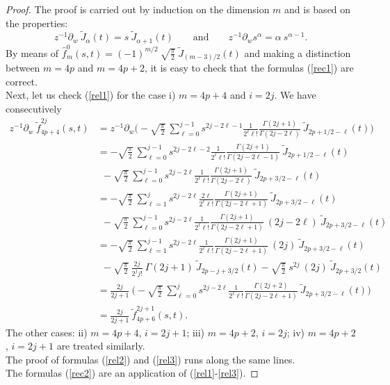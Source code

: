 \documentclass{amsart}
\theoremstyle{remark}
\begin{document}
\begin{proof}
The proof is carried out by induction on the dimension $m$ and is based on the properties:
\begin{displaymath}
z^{-1}  \partial_w \ \widetilde{J}_{\alpha}(t) = s \ \widetilde{J}_{\alpha + 1}(t) \qquad \mathrm{and} \qquad z^{-1}  \partial_w s^{\alpha} = \alpha \ s^{\alpha - 1} .
\end{displaymath}
By means of $\hat{f}_m^0(s,t) = (-1)^{m/2} \ \sqrt{\frac{\pi}{2}} \ \widetilde{J}_{(m-3)/2}(t)$ and making a distinction between $m=4p$ and $m=4p+2$, it is easy to check that the formulas (\ref{rec1}) are correct.\\
Next, let us check (\ref{rel1}) for the case i) $m=4p+4$ and $i=2j$. We have consecutively 
\begin{align*}
z^{-1} \partial_w \ \tilde{f}^{2j}_{4p+4}(s,t) &=  z^{-1} \partial_w \biggl( - \sqrt{\frac{\pi}{2}} \ \sum_{\ell=0}^{j-1} s^{2j-2\ell-1} \frac{1}{2^{\ell} \ell!} \frac{\Gamma (2j+1)}{\Gamma (2j -2 \ell)} \ \widetilde{J}_{2p+1/2-\ell}(t) \biggr)\\
&=  - \sqrt{\frac{\pi}{2}} \ \sum_{\ell=0}^{j-1} s^{2j-2\ell-2} \frac{1}{2^{\ell} \ell!} \frac{\Gamma (2j+1)}{\Gamma (2j -2 \ell-1)} \ \widetilde{J}_{2p+1/2-\ell}(t)\\
& \ \ - \sqrt{\frac{\pi}{2}} \ \sum_{\ell=0}^{j-1} s^{2j-2\ell} \frac{1}{2^{\ell} \ell!} \frac{\Gamma (2j+1)}{\Gamma (2j -2 \ell)} \ \widetilde{J}_{2p+3/2-\ell}(t)\\
&=  - \sqrt{\frac{\pi}{2}} \ \sum_{\ell=1}^{j} s^{2j-2\ell} \frac{2 \ell}{2^{\ell} \ell!} \frac{\Gamma (2j+1)}{\Gamma (2j -2 \ell+1)} \ \widetilde{J}_{2p+3/2-\ell}(t)\\
& \ \  - \sqrt{\frac{\pi}{2}} \ \sum_{\ell=0}^{j-1} s^{2j-2\ell} \frac{1}{2^{\ell} \ell!} \frac{\Gamma (2j+1)}{\Gamma (2j -2 \ell+1)} \ (2j-2\ell) \ \widetilde{J}_{2p+3/2-\ell}(t)
\\
&=  - \sqrt{\frac{\pi}{2}} \ \sum_{\ell=1}^{j-1}  s^{2j-2\ell} \frac{1}{2^{\ell} \ell!} \frac{\Gamma (2j+1)}{\Gamma (2j -2 \ell+1)} \ (2j) \  \widetilde{J}_{2p+3/2- \ell}(t)\\
& \ \  - \sqrt{\frac{\pi}{2}} \ \frac{2j}{2^j j!} \ \Gamma (2j+1) \ \widetilde{J}_{2p-j+3/2}(t) - \sqrt{\frac{\pi}{2}} \ s^{2j} \ (2j) \ \widetilde{J}_{2p+3/2}(t)\\
&=  \frac{2j}{2j+1} \ \biggl( - \sqrt{\frac{\pi}{2}} \ \sum_{\ell=0}^{j} s^{2j-2\ell} \frac{1}{2^{\ell} \ell!} \frac{\Gamma (2j+2)}{\Gamma (2j -2 \ell+1)} \ \widetilde{J}_{2p+3/2-\ell}(t) \biggr)\\
&=  \frac{2j}{2j+1} \ \tilde{f}_{4p+6}^{2j+1}(s,t).
\end{align*}
The other cases: ii) $m=4p+4$, $i=2j+1$; iii) $m=4p+2$, $i=2j$; iv) $m=4p+2$, $i=2j+1$ are treated similarly.\\
The proof of formulas (\ref{rel2}) and (\ref{rel3}) runs along the same lines.\\
The formulas (\ref{rec2}) are an application of (\ref{rel1}-\ref{rel3}).
\end{proof}
\end{document}
